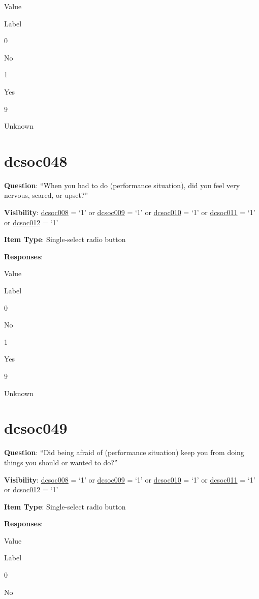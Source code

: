 \documentclass[]{book}
\begin{document}
Value

Label

0

No

1

Yes

9

Unknown

\hypertarget{dcsoc048}{%
\section{dcsoc048}\label{dcsoc048}}

\textbf{Question}: ``When you had to do (performance situation), did you feel very nervous, scared, or upset?''

\textbf{Visibility}: \protect\hyperlink{dcsoc008}{dcsoc008} = `1' or \protect\hyperlink{dcsoc009}{dcsoc009} = `1' or \protect\hyperlink{dcsoc010}{dcsoc010} = `1' or \protect\hyperlink{dcsoc011}{dcsoc011} = `1' or \protect\hyperlink{dcsoc012}{dcsoc012} = `1'

\textbf{Item Type}: Single-select radio button

\textbf{Responses}:

Value

Label

0

No

1

Yes

9

Unknown

\hypertarget{dcsoc049}{%
\section{dcsoc049}\label{dcsoc049}}

\textbf{Question}: ``Did being afraid of (performance situation) keep you from doing things you should or wanted to do?''

\textbf{Visibility}: \protect\hyperlink{dcsoc008}{dcsoc008} = `1' or \protect\hyperlink{dcsoc009}{dcsoc009} = `1' or \protect\hyperlink{dcsoc010}{dcsoc010} = `1' or \protect\hyperlink{dcsoc011}{dcsoc011} = `1' or \protect\hyperlink{dcsoc012}{dcsoc012} = `1'

\textbf{Item Type}: Single-select radio button

\textbf{Responses}:

Value

Label

0

No
\end{document}
